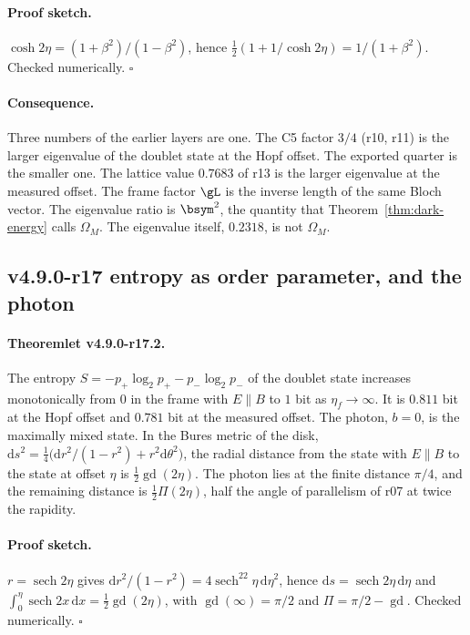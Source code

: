 \paragraph{Proof sketch.}
\(\cosh2\eta=(1+\beta^2)/(1-\beta^2)\), hence \(\tfrac12(1+1/\cosh2\eta)=1/(1+\beta^2)\).  Checked numerically.  \(\square\)

\paragraph{Consequence.}
Three numbers of the earlier layers are one.  The C5 factor \(3/4\) (r10, r11) is the larger eigenvalue of the doublet state at
the Hopf offset.  The exported quarter is the smaller one.  The lattice value \(0.7683\) of r13 is the larger eigenvalue at the
measured offset.  The frame factor \(\gL\) is the inverse length of the same Bloch vector.  The eigenvalue ratio is \(\bsym^2\), the
quantity that Theorem~\ref{thm:dark-energy} calls \(\Omega_M\).  The eigenvalue itself, \(0.2318\), is not \(\Omega_M\).

\subsection*{v4.9.0-r17 entropy as order parameter, and the photon}
\label{subsec:v490-r17-entropy}

\paragraph{Theoremlet v4.9.0-r17.2.}
The entropy \(S=-p_+\log_2p_+-p_-\log_2p_-\) of the doublet state increases monotonically from \(0\) in the frame with
\(E\parallel B\) to \(1\) bit as \(\eta_f\to\infty\).  It is \(0.811\) bit at the Hopf offset and \(0.781\) bit at the measured
offset.  The photon, \(b=0\), is the maximally mixed state.  In the Bures metric of the disk,
\(\mathrm ds^2=\tfrac14\bigl(\mathrm dr^2/(1-r^2)+r^2\mathrm d\theta^2\bigr)\), the radial distance from the state with \(E\parallel B\)
to the state at offset \(\eta\) is \(\tfrac12\operatorname{gd}(2\eta)\).  The photon lies at the finite distance \(\pi/4\), and the remaining
distance is \(\tfrac12\Pi(2\eta)\), half the angle of parallelism of r07 at twice the rapidity.

\paragraph{Proof sketch.}
\(r=\operatorname{sech}2\eta\) gives \(\mathrm dr^2/(1-r^2)=4\operatorname{sech}^22\eta\,\mathrm d\eta^2\), hence \(\mathrm ds=\operatorname{sech}2\eta\,\mathrm d\eta\)
and \(\int_0^\eta\operatorname{sech}2x\,\mathrm dx=\tfrac12\operatorname{gd}(2\eta)\), with \(\operatorname{gd}(\infty)=\pi/2\) and
\(\Pi=\pi/2-\operatorname{gd}\).  Checked numerically.  \(\square\)

